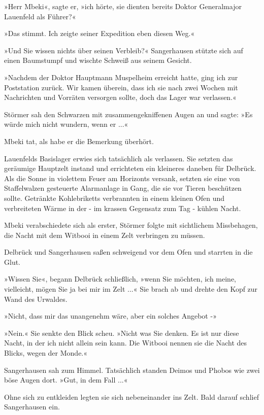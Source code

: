 »Herr Mbeki«, sagte er, »ich hörte, sie dienten bereits Doktor
Generalmajor Lauenfeld als Führer?«

»Das stimmt. Ich zeigte seiner Expedition eben diesen Weg.«

»Und Sie wissen nichts über seinen Verbleib?« Sangerhausen stützte
sich auf einen Baumstumpf und wischte Schweiß aus seinem Gesicht.

»Nachdem der Doktor Hauptmann Muspelheim erreicht hatte, ging ich
zur Poststation zurück. Wir kamen überein, dass ich sie nach zwei
Wochen mit Nachrichten und Vorräten versorgen sollte, doch das
Lager war verlassen.«

Störmer sah den Schwarzen mit zusammengekniffenen Augen an und
sagte: »Es würde mich nicht wundern, wenn er ...«

Mbeki tat, als habe er die Bemerkung überhört.

\bigpar

Lauenfelds Basislager erwies sich tatsächlich als verlassen. Sie
setzten das geräumige Hauptzelt instand und errichteten ein
kleineres daneben für Delbrück. Als die Sonne in violettem Feuer am
Horizonts versank, setzten sie eine von Staffelwalzen gesteuerte
Alarmanlage in Gang, die sie vor Tieren beschützen sollte.
Getränkte Kohlebriketts verbrannten in einem kleinen Ofen und
verbreiteten Wärme in der - im krassen Gegensatz zum Tag - kühlen
Nacht.

Mbeki verabschiedete sich als erster, Störmer folgte mit
sichtlichem Missbehagen, die Nacht mit dem Witbooi in einem Zelt
verbringen zu müssen.

Delbrück und Sangerhausen saßen schweigend vor dem Ofen und
starrten in die Glut.

»Wissen Sie«, begann Delbrück schließlich, »wenn Sie möchten, ich
meine, vielleicht, mögen Sie ja bei mir im Zelt ...« Sie brach ab
und drehte den Kopf zur Wand des Urwaldes.

»Nicht, dass mir das unangenehm wäre, aber ein solches Angebot -»

»Nein.« Sie senkte den Blick scheu. »Nicht was Sie denken. Es ist
nur diese Nacht, in der ich nicht allein sein kann. Die Witbooi
nennen sie die Nacht des Blicks, wegen der Monde.«

Sangerhausen sah zum Himmel. Tatsächlich standen Deimos und Phobos
wie zwei böse Augen dort. »Gut, in dem Fall ...«

Ohne sich zu entkleiden legten sie sich nebeneinander ins Zelt.
Bald darauf schlief Sangerhausen ein.

